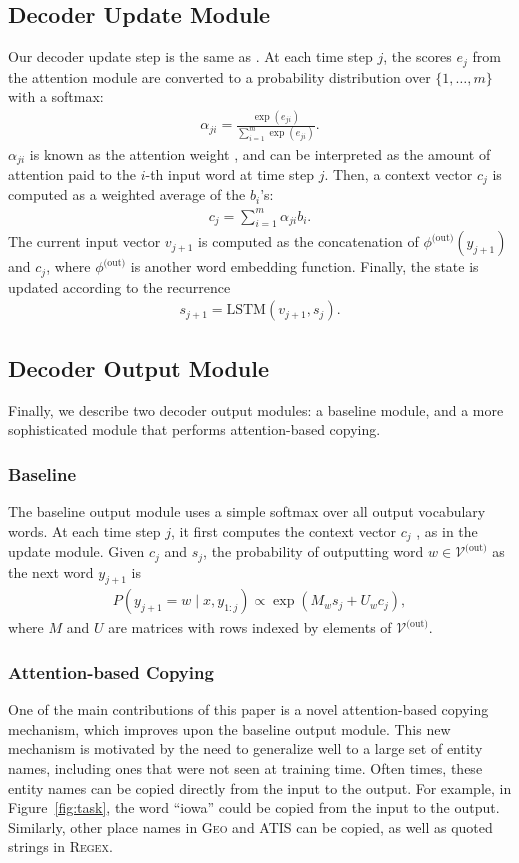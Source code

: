 \documentclass[11pt,letterpaper]{article}
\newcommand{\atis}{\textsc{ATIS}\xspace}
\newcommand{\regex}{\textsc{Regex}\xspace}
\newcommand{\geo}{\textsc{Geo}\xspace}
\newcommand{\vocabout}{\mathcal{V}^{\text{(out)}}}
\newcommand{\phiout}{\phi^{\text{(out)}}}
\begin{document}
\subsection{Decoder Update Module}
Our decoder update step is the same as .
At each time step $j$, the scores $e_j$ 
from the attention module are converted to a probability distribution 
over $\{1, \dotsc, m\}$ with a softmax:
\begin{align}
  \alpha_{ji} = \frac{\exp(e_{ji})}{\sum_{i=1}^m \exp(e_{ji})}.
\end{align}
$\alpha_{ji}$ is known as the attention weight \cite{bahdanau2014neural},
and can be interpreted as the amount of attention
paid to the $i$-th input word at time step $j$.
Then, a context vector $c_j$ is computed as a weighted average of the $b_i$'s:
\begin{align}
  c_j = \sum_{i=1}^m \alpha_{ji} b_i.
\end{align}
The current input vector $v_{j+1}$ is computed as 
the concatenation of $\phiout(y_{j+1})$ and $c_{j}$,
where $\phiout$ is another word embedding function.
Finally, the state is updated according to the recurrence
\begin{align}
  s_{j+1} = \text{LSTM}(v_{j+1}, s_j).
\end{align}

\subsection{Decoder Output Module}
Finally, we describe two decoder output modules: a baseline module, and a
more sophisticated module that performs attention-based copying.

\subsubsection{Baseline}
\label{sec:baseline-output}
The baseline output module uses a simple softmax over all
output vocabulary words.
At each time step $j$, it first computes the context vector $c_j$ ,
as in the update module.
Given $c_j$ and $s_j$, the probability of outputting word $w \in \vocabout$ 
as the next word $y_{j+1}$ is
\begin{align}
  P(y_{j+1} = w \mid x, y_{1:j}) \propto \exp(M_{w} s_j + U_w c_j),
\end{align}
where $M$ and $U$ are matrices with rows indexed by elements of $\vocabout$.

\subsubsection{Attention-based Copying}
One of the main contributions of this paper is a 
novel attention-based copying mechanism,
which improves upon the baseline output module.
This new mechanism is motivated by the need 
to generalize well to a large set of entity names,
including ones that were not seen at training time.
Often times, these entity names
can be copied directly from the input to the output.
For example, in Figure~\ref{fig:task},
the word ``iowa'' could be copied from the input
to the output.
Similarly, other place names in \geo and \atis can be copied,
as well as quoted strings in \regex.
\end{document}
